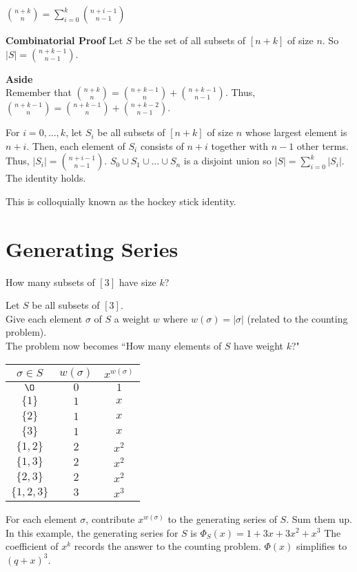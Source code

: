 \documentclass{article}
\newcommand{\oto}[1]{$[#1]$}
\newcommand{\union}{\cup}
\begin{document}
\begin{ident}
	$\binom {n+k}n = \sum_{i=0}^{k}\binom {n+i-1}{n-1}$
\end{ident}

\textbf{Combinatorial Proof}
Let $S$ be the set of all subsets of \oto{n+k} of size $n$. So $|S| = \binom {n+k-1}{n-1}$.

\textbf{Aside\\} %
Remember that $\binom {n+k}n = \binom {n+k-1}n + \binom {n+k-1}{n-1}$. Thus, $\binom {n+k-1}n = \binom {n+k-1}n + \binom{n+k-2}{n-1}$.

For $i=0, \dots , k$, let $S_i$ be all subsets of \oto{n+k} of size $n$ whose largest element is $n+i$. Then, each element of $S_i$ consists of $n+i$ together with $n-1$ other terms. Thus, $|S_i| = \binom {n+i-1}{n-1}$. $S_0 \union S_1 \union \dots \union S_n$ is a disjoint union so $|S| = \sum_{i=0}^{k}|S_i|$. The identity holds.

This is colloquially known as the hockey stick identity.

\section{Generating Series}
\example
How many subsets of \oto{3} have size $k$?

Let $S$ be all subsets of \oto{3}.\\
Give each element $\sigma$ of $S$ a weight $w$ where $w(\sigma) = |\sigma|$ (related to the counting problem).
\\
The problem now becomes ``How many elements of $S$ have weight $k$?"


\begin{tabular}{|c|c|c|}
	\hline $\sigma \in S$ & $w(\sigma)$ & $x^{w(\sigma)}$ \\ 
	\hline $\O$ & $0$ & $1$ \\ 
	\hline $\{1\}$ & $1$ & $x$ \\ 
	\hline $\{2\}$ & $1$ & $x$ \\ 
	\hline $\{3\}$ & $1$ & $x$ \\ 
	\hline $\{1,2\}$ & $2$ & $x^2$ \\ 
	\hline $\{1,3\}$ & $2$ & $x^2$ \\ 
	\hline $\{2,3\}$ & $2$ & $x^2$ \\ 
	\hline $\{1,2,3\}$ & $3$ & $x^3$ \\ 
	\hline 
\end{tabular}

For each element $\sigma$, contribute $x^{w(\sigma)}$ to the generating series of $S$. Sum them up. In this example, the generating series for $S$ is $\Phi_S(x)=1+3x+3x^2+x^3$ The coefficient of $x^k$ records the answer to the counting problem. $\Phi(x)$ simplifies to $(q+x)^3$.
\end{document}
